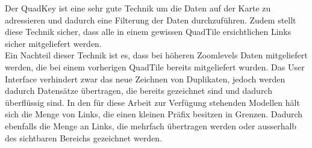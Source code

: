 \noindent
Der QuadKey ist eine sehr gute Technik um die Daten auf der Karte zu adressieren und dadurch eine Filterung der Daten durchzuführen. Zudem stellt diese Technik sicher, dass alle in einem gewissen QuadTile ersichtlichen Links sicher mitgeliefert werden.\\
Ein Nachteil dieser Technik ist es, dass bei höheren Zoomlevels Daten mitgeliefert werden, die bei einem vorherigen QuadTile bereits mitgeliefert wurden. Das User Interface verhindert zwar das neue Zeichnen von Duplikaten, jedoch werden dadurch Datensätze übertragen, die bereits gezeichnet sind und dadurch überflüssig sind. In den für diese Arbeit zur Verfügung stehenden Modellen hält sich die Menge von Links, die einen kleinen Präfix besitzen in Grenzen. Dadurch ebenfalls die Menge an Links, die mehrfach übertragen werden oder ausserhalb des sichtbaren Bereichs gezeichnet werden.
\newpage
